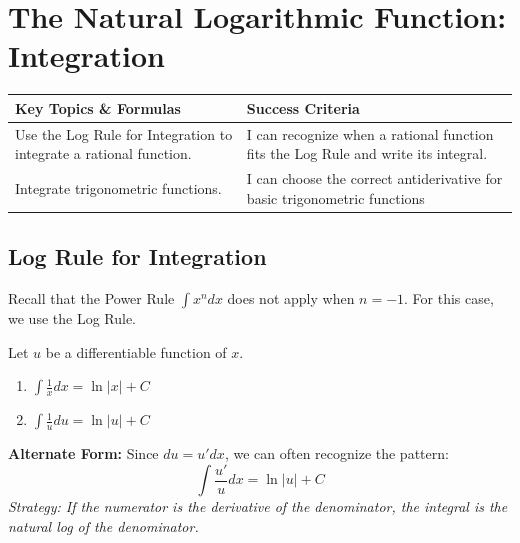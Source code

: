 \documentclass[12pt, letterpaper]{article}
\begin{document}
\newpage
\section{The Natural Logarithmic Function: Integration}
\begin{objectives}
    \renewcommand{\arraystretch}{1.5} %
    \begin{tabularx}{\textwidth}{@{} >{\raggedright\arraybackslash}X >{\raggedright\arraybackslash}X @{}}
        
        \textbf{Key Topics \& Formulas} & \textbf{Success Criteria} \\ 
        \midrule[1.5pt] %
        
        Use the Log Rule for Integration to integrate a rational function. 
        &  I can recognize when a rational function fits the Log Rule and write its integral. \\
        \midrule %
        
        Integrate trigonometric functions.
        & I can choose the correct antiderivative for basic trigonometric functions
    \end{tabularx}
\end{objectives}

\subsection{Log Rule for Integration}

Recall that the Power Rule $\int x^n dx$ does not apply when $n=-1$. For this case, we use the Log Rule.

\begin{theorem}[title=Log Rule for Integration]
\tcblower
    Let $u$ be a differentiable function of $x$.
    \begin{enumerate}
        \item $\displaystyle \int \frac{1}{x}dx = \ln|x| +C$
        \item $\displaystyle \int \frac{1}{u} du = \ln|u|+C$
    \end{enumerate}
\end{theorem}

\textbf{Alternate Form:} Since $du = u' dx$, we can often recognize the pattern:
\[ \int \frac{u'}{u} dx = \ln|u|+C \]
\textit{Strategy: If the numerator is the derivative of the denominator, the integral is the natural log of the denominator.}
\end{document}
